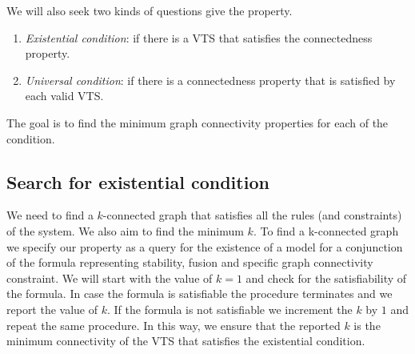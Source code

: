 \vspace{0.2cm}
\noindent We will also seek two kinds of questions give the property.
\begin{enumerate}
\item {\em Existential condition}:
if there is a VTS that satisfies the connectedness property. 

\item {\em Universal condition}:
  if there is a connectedness property that is satisfied by each valid VTS.
\end{enumerate}
The goal is to find the minimum graph connectivity properties for each of the condition.
\subsection{Search for existential condition} 
%
%
We need to find a $k$-connected graph that satisfies all the rules (and constraints) of the system. 
%
We also aim to find the minimum $k$. 
%
%
To find a k-connected graph we specify our property as a query for the existence
of a model for a conjunction of the formula representing stability, fusion and specific
graph connectivity constraint. 
%
%
We will start with the value of $k = 1$ and check for the satisfiability of the formula.
%
In case the formula is satisfiable the procedure terminates and we report the value of $k$. 
%
If the formula is not satisfiable we increment the $k$ by $1$ and repeat the same procedure. 
%
In this way, we ensure that the reported $k$ is the minimum connectivity of the VTS that
satisfies the existential condition.
%

